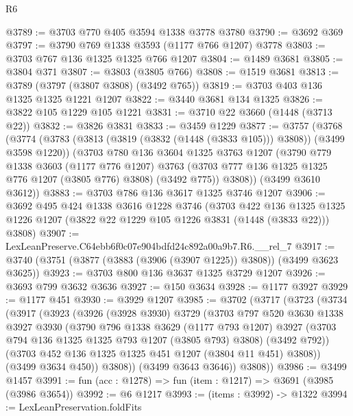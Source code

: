 \begin{lexlean}{R6}
\begin{coremodule}
@3789 := @3703 @770 @405 @3594 @1338 @3778 @3780
@3790 := @3692 @369
@3797 := @3790 @769 @1338 @3593 (@1177 @766 @1207) @3778
@3803 := @3703 @767 @136 @1325 @1325 @766 @1207
@3804 := @1489 @3681
@3805 := @3804 @371
@3807 := @3803 (@3805 @766)
@3808 := @1519 @3681
@3813 := @3789 (@3797 (@3807 @3808) (@3492 @765))
@3819 := @3703 @403 @136 @1325 @1325 @1221 @1207
@3822 := @3440 @3681 @134 @1325
@3826 := @3822 @105 @1229 @105 @1221
@3831 := @3710 @22 @3660 (@1448 (@3713 @22))
@3832 := @3826 @3831
@3833 := @3459 @1229
@3877 := @3757
    (@3768
      (@3774
        (@3783 (@3813 (@3819 (@3832 (@1448 (@3833 @105))) @3808)) (@3499 @3598 @1220))
        (@3703
          @780
          @136
          @3604
          @1325
          @3763
          @1207
          (@3790
            @779
            @1338
            @3603
            (@1177 @776 @1207)
            @3763
            (@3703 @777 @136 @1325 @1325 @776 @1207 (@3805 @776) @3808)
            (@3492 @775))
          @3808))
      (@3499 @3610 @3612))
@3883 := @3703 @786 @136 @3617 @1325 @3746 @1207
@3906 := @3692
    @495
    @424
    @1338
    @3616
    @1228
    @3746
    (@3703
      @422
      @136
      @1325
      @1325
      @1226
      @1207
      (@3822 @22 @1229 @105 @1226 @3831 (@1448 (@3833 @22)))
      @3808)
@3907 := LexLeanPreserve.C64ebb6f0c07e904bdfd24c892a00a9b7.R6.__rel_7
@3917 := @3740 (@3751 (@3877 (@3883 (@3906 (@3907 @1225)) @3808)) (@3499 @3623 @3625))
@3923 := @3703 @800 @136 @3637 @1325 @3729 @1207
@3926 := @3693 @799 @3632 @3636
@3927 := @150 @3634
@3928 := @1177 @3927
@3929 := @1177 @451
@3930 := @3929 @1207
@3985 := @3702
    (@3717
      (@3723
        (@3734
          (@3917
            (@3923
              (@3926
                (@3928 @3930)
                @3729
                (@3703
                  @797
                  @520
                  @3630
                  @1338
                  @3927
                  @3930
                  (@3790
                    @796
                    @1338
                    @3629
                    (@1177 @793 @1207)
                    @3927
                    (@3703 @794 @136 @1325 @1325 @793 @1207 (@3805 @793) @3808)
                    (@3492 @792))
                  (@3703 @452 @136 @1325 @1325 @451 @1207 (@3804 @11 @451) @3808))
                (@3499 @3634 @450))
              @3808))
          (@3499 @3643 @3646))
        @3808))
@3986 := @3499 @1457
@3991 := fun (acc : @1278) => fun (item : @1217) => @3691 (@3985 (@3986 @3654))
@3992 := @6 @1217
@3993 := (items : @3992) -> @1322
@3994 := LexLeanPreservation.foldFits

\end{coremodule}
\end{lexlean}
